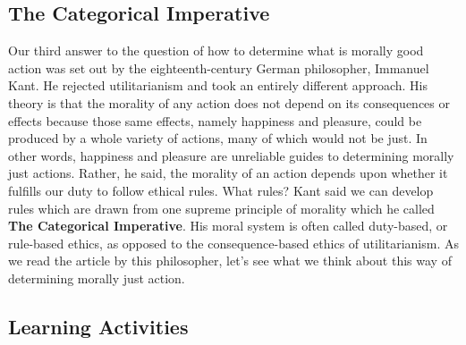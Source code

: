 \documentclass[
]{book}
\begin{document}
\hypertarget{the-categorical-imperative}{%
\subsection*{The Categorical Imperative}\label{the-categorical-imperative}}

Our third answer to the question of how to determine what is morally good action was set out by the eighteenth-century German philosopher, Immanuel Kant. He rejected utilitarianism and took an entirely different approach. His theory is that the morality of any action does not depend on its consequences or effects because those same effects, namely happiness and pleasure, could be produced by a whole variety of actions, many of which would not be just. In other words, happiness and pleasure are unreliable guides to determining morally just actions.
Rather, he said, the morality of an action depends upon whether it fulfills our duty to follow ethical rules. What rules? Kant said we can develop rules which are drawn from one supreme principle of morality which he called \textbf{The Categorical Imperative}. His moral system is often called duty-based, or rule-based ethics, as opposed to the consequence-based ethics of utilitarianism. As we read the article by this philosopher, let's see what we think about this way of determining morally just action.

\hypertarget{learning-activities-10}{%
\subsection*{Learning Activities}\label{learning-activities-10}}
\end{document}

